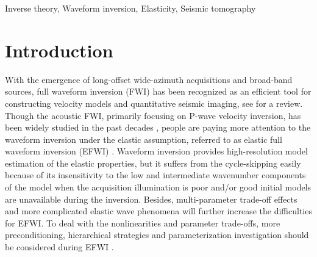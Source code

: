 \documentclass[extra,mreferee]{gji}
\begin{document}
\begin{keywords}
Inverse theory, Waveform inversion, Elasticity, Seismic tomography
\end{keywords}
\section{Introduction}
With the emergence of long-offset wide-azimuth acquisitions and broad-band sources,
full waveform inversion (FWI) has been recognized as an
efficient tool for constructing velocity models and quantitative seismic imaging, see
\cite{virieux2009overview} for a review.
Though the acoustic FWI, primarily focusing on P-wave velocity inversion, has been
widely studied in the past decades
\cite[]{tarantola1984,pratt1998gauss,shipp:2002}, people are paying more attention
to the waveform inversion under the elastic assumption, referred to as elastic full waveform inversion
(EFWI) \cite[]{tarantola1986}.
Waveform inversion provides high-resolution model estimation of the elastic
properties, but it
suffers from the cycle-skipping easily because of its insensitivity to the low and intermediate wavenumber components of the model
when the acquisition illumination is poor and/or good initial models are unavailable during the inversion\cite[]{sears2008,brossier2009}.
Besides, multi-parameter trade-off effects and more complicated elastic wave phenomena
will further increase the difficulties for EFWI.
To deal with the nonlinearities and parameter trade-offs, more
preconditioning, hierarchical strategies and parameterization investigation should be
considered during EFWI
\cite[]{sears2008,prieux:2013b,operto2013guided,wang:2015,Oh2016}.
\end{document}
